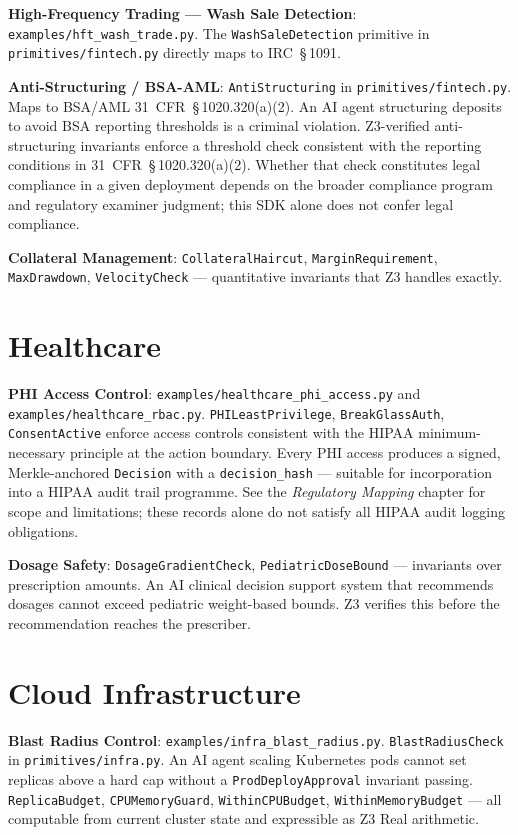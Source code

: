 \documentclass[12pt,a4paper,oneside]{report}
\newcommand{\fname}[1]{\texttt{#1}}          %
\newcommand{\code}[1]{\texttt{#1}}           %
\begin{document}
\textbf{High-Frequency Trading --- Wash Sale Detection}:
\fname{examples/hft\_wash\_trade.py}. The \code{WashSaleDetection} primitive
in \fname{primitives/fintech.py} directly maps to IRC~\S\,1091.

\textbf{Anti-Structuring / BSA-AML}: \code{AntiStructuring} in
\fname{primitives/fintech.py}. Maps to BSA/AML 31~CFR~\S\,1020.320(a)(2). An
AI agent structuring deposits to avoid BSA reporting thresholds is a criminal
violation. Z3-verified anti-structuring invariants enforce a threshold check consistent
with the reporting conditions in 31~CFR~\S\,1020.320(a)(2).  Whether that
check constitutes legal compliance in a given deployment depends on the
broader compliance program and regulatory examiner judgment; this SDK alone
does not confer legal compliance.

\textbf{Collateral Management}: \code{CollateralHaircut},
\code{MarginRequirement}, \code{MaxDrawdown}, \code{VelocityCheck} ---
quantitative invariants that Z3 handles exactly.

\section{Healthcare}

\textbf{PHI Access Control}: \fname{examples/healthcare\_phi\_access.py} and
\fname{examples/healthcare\_rbac.py}. \code{PHILeastPrivilege},
\code{BreakGlassAuth}, \code{ConsentActive} enforce access controls
consistent with the HIPAA minimum-necessary principle at the action boundary.
Every PHI access produces a signed, Merkle-anchored \code{Decision} with a
\code{decision\_hash} --- suitable for incorporation into a HIPAA audit trail
programme.  See the \textit{Regulatory Mapping} chapter for scope and
limitations; these records alone do not satisfy all HIPAA audit logging
obligations.

\textbf{Dosage Safety}: \code{DosageGradientCheck},
\code{PediatricDoseBound} --- invariants over prescription amounts. An AI
clinical decision support system that recommends dosages cannot exceed
pediatric weight-based bounds. Z3 verifies this before the recommendation
reaches the prescriber.

\section{Cloud Infrastructure}

\textbf{Blast Radius Control}: \fname{examples/infra\_blast\_radius.py}.
\code{BlastRadiusCheck} in \fname{primitives/infra.py}. An AI agent scaling
Kubernetes pods cannot set replicas above a hard cap without a
\code{ProdDeployApproval} invariant passing. \code{ReplicaBudget},
\code{CPUMemoryGuard}, \code{WithinCPUBudget}, \code{WithinMemoryBudget} ---
all computable from current cluster state and expressible as Z3 Real
arithmetic.
\end{document}
